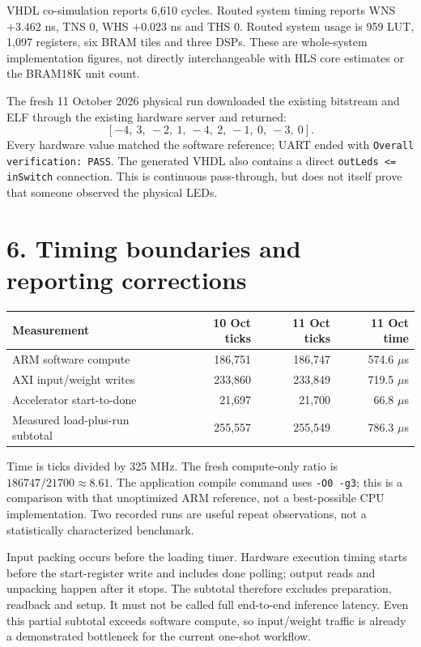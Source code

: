 \documentclass[11pt,a4paper]{article}
\begin{document}
VHDL co-simulation reports 6,610 cycles. Routed system timing reports WNS
$+3.462$ ns, TNS 0, WHS $+0.023$ ns and THS 0. Routed system usage is
959 LUT, 1,097 registers, six BRAM tiles and three DSPs. These are whole-system
implementation figures, not directly interchangeable with HLS core estimates
or the BRAM18K unit count.

The fresh 11 October 2026 physical run downloaded the existing bitstream and
ELF through the existing hardware server and returned:
\[
[-4,\ 3,\ -2,\ 1,\ -4,\ 2,\ -1,\ 0,\ -3,\ 0].
\]
Every hardware value matched the software reference; UART ended with
\texttt{Overall verification: PASS}. The generated VHDL also contains a direct
\texttt{outLeds <= inSwitch} connection. This is continuous pass-through,
but does not itself prove that someone observed the physical LEDs.

\newpage
\section*{6. Timing boundaries and reporting corrections}
\begin{center}
\begin{tabular}{lrrr}
\toprule Measurement & 10 Oct ticks & 11 Oct ticks & 11 Oct time \\
\midrule
ARM software compute & 186,751 & 186,747 & 574.6 $\mu$s \\
AXI input/weight writes & 233,860 & 233,849 & 719.5 $\mu$s \\
Accelerator start-to-done & 21,697 & 21,700 & 66.8 $\mu$s \\
Measured load-plus-run subtotal & 255,557 & 255,549 & 786.3 $\mu$s \\
\bottomrule
\end{tabular}
\end{center}
Time is ticks divided by 325 MHz. The fresh compute-only ratio is
$186747/21700\approx8.61$. The application compile command uses
\texttt{-O0 -g3}; this is a comparison with that unoptimized ARM reference,
not a best-possible CPU implementation. Two recorded runs are useful
repeat observations, not a statistically characterized benchmark.

Input packing occurs before the loading timer. Hardware execution timing starts
before the start-register write and includes done polling; output reads and
unpacking happen after it stops. The subtotal therefore excludes preparation,
readback and setup. It must not be called full end-to-end inference latency.
Even this partial subtotal exceeds software compute, so input/weight traffic
is already a demonstrated bottleneck for the current one-shot workflow.
\end{document}
